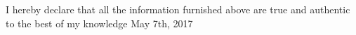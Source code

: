 \begin{cventries}
  \cventry
    {}
    {I hereby declare that all the information furnished above are true and authentic to the best of my knowledge}
    {May 7th, 2017}
    {}
    {
    }
\end{cventries}
